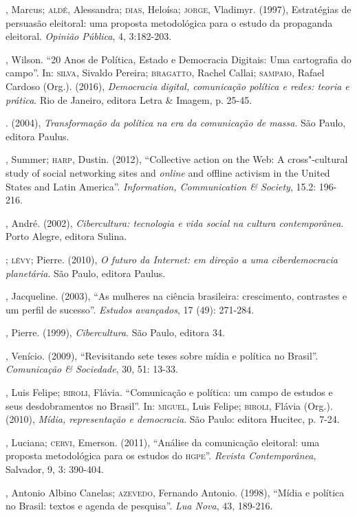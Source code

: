 \begin{bibliohedra}
, Marcus; \textsc{aldé}, Alessandra; \textsc{dias}, Heloísa; \textsc{jorge}, Vladimyr.
(1997), Estratégias de persuasão eleitoral: uma proposta metodológica
para o estudo da propaganda eleitoral. \emph{Opinião Pública}, 4,
3:182-203.

, Wilson. ``20 Anos de Política, Estado e Democracia Digitais: Uma
cartografia do campo''. In: \textsc{silva}, Sivaldo Pereira; \textsc{bragatto}, Rachel
Callai; \textsc{sampaio}, Rafael Cardoso (Org.). (2016), \emph{Democracia
digital, comunicação política e redes: teoria e prática}. Rio
de Janeiro, editora Letra \& Imagem, p. 25-45.

\titidem. (2004), \emph{Transformação da política na era da
comunicação de massa}. São Paulo, editora Paulus.

, Summer; \textsc{harp}, Dustin. (2012), ``Collective action on the Web: A
cross"-cultural study of social networking sites and \emph{\emph{online}} and offline
activism in the United States and Latin America''. \emph{Information,
Communication \& Society}, 15.2: 196-216.

, André. (2002), \emph{Cibercultura: tecnologia e vida social na
cultura contemporânea}. Porto Alegre, editora Sulina.

\titidem; \textsc{lévy}; Pierre. (2010), \emph{O futuro da Internet: em
direção a uma ciberdemocracia planetária}. São Paulo, editora Paulus.

, Jacqueline. (2003), ``As mulheres na ciência brasileira:
crescimento, contrastes e um perfil de sucesso''. \emph{Estudos
avançados}, 17 (49): 271-284.

, Pierre. (1999), \emph{Cibercultura}. São Paulo, editora 34.

, Venício. (2009), ``Revisitando sete teses sobre mídia e política
no Brasil''. \emph{Comunicação \& Sociedade}, 30, 51: 13-33.

, Luis Felipe; \textsc{biroli}, Flávia. ``Comunicação e política: um campo
de estudos e seus desdobramentos no Brasil''. In: \textsc{miguel}, Luis Felipe;
\textsc{biroli}, Flávia (Org.). (2010), \emph{Mídia, representação e democracia}.
São Paulo: editora Hucitec, p. 7-24.

, Luciana; \textsc{cervi}, Emerson. (2011), ``Análise da comunicação
eleitoral: uma proposta metodológica para os estudos do \textsc{hgpe}''.
\emph{Revista Contemporânea}, Salvador, 9, 3: 390-404.

, Antonio Albino Canelas; \textsc{azevedo}, Fernando Antonio. (1998),
``Mídia e política no Brasil: textos e agenda de pesquisa''. \emph{Lua
Nova}, 43, 189-216.


\end{bibliohedra}
